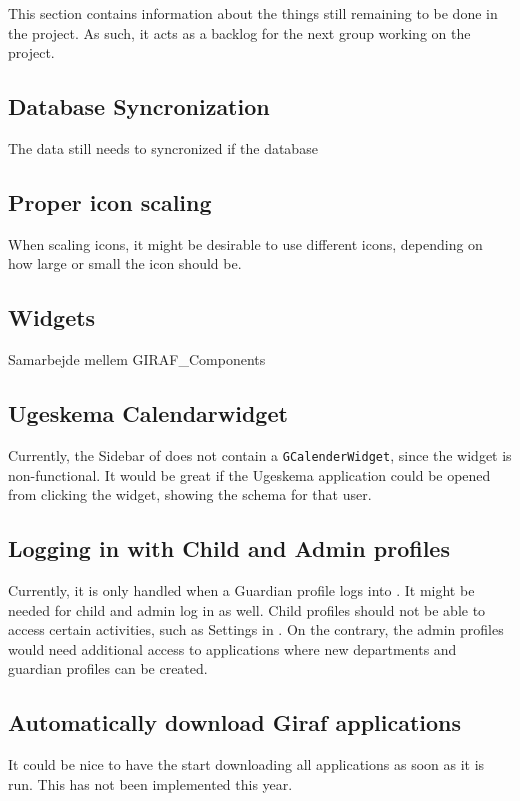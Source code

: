 This section contains information about the things still remaining to be done in the \launcher project.
As such, it acts as a backlog for the next group working on the project.

\subsection{Database Syncronization}
The data still needs to syncronized if the database

\subsection{Proper icon scaling}
When scaling icons, it might be desirable to use different icons, depending on how large or small the icon should be.

\subsection{Widgets}
Samarbejde mellem GIRAF\_Components

\subsection{Ugeskema Calendarwidget}
Currently, the Sidebar of \launcher does not contain a \lstinline!GCalenderWidget!, since the widget is non-functional.
It would be great if the Ugeskema application could be opened from clicking the widget, showing the schema for that user.

\subsection{Logging in with Child and Admin profiles}
Currently, it is only handled when a Guardian profile logs into \launcher.
It might be needed for child and admin log in as well.
Child profiles should not be able to access certain activities, such as Settings in \launcher.
On the contrary, the admin profiles would need additional access to applications where new departments and guardian profiles can be created.

\subsection{Automatically download Giraf applications}
It could be nice to have the \launcher start downloading all \giraf applications as soon as it is run.
This has not been implemented this year.
 

